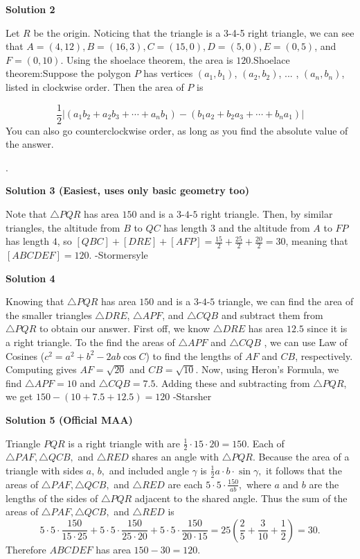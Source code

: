 \begin{enumerate}
\textbf{Solution 2}

Let $R$ be the origin. Noticing that the triangle is a 3-4-5 right triangle, we can see that $A=(4,12), B=(16,3), C=(15,0), D=(5,0), E=(0,5)$, and $F=(0,10)$. Using the shoelace theorem, the area is $\boxed{120}$.Shoelace theorem:Suppose the polygon $P$ has vertices $(a_1, b_1)$, $(a_2, b_2)$, ... , $(a_n, b_n)$, listed in clockwise order. Then the area of $P$ is

 
 \[\dfrac{1}{2} |(a_1b_2 + a_2b_3 + \cdots + a_nb_1) - (b_1a_2 + b_2a_3 + \cdots + b_na_1)|\]You can also go counterclockwise order, as long as you find the absolute value of the answer.

 .

 



\textbf{Solution 3 (Easiest, uses only basic geometry too)}

Note that $\triangle{PQR}$ has area $150$ and is a $3$-$4$-$5$ right triangle. Then, by similar triangles, the altitude from $B$ to $QC$ has length $3$ and the altitude from $A$ to $FP$ has length $4$, so $[QBC]+[DRE]+[AFP]=\frac{15}{2}+\frac{25}{2}+\frac{20}{2}=30$, meaning that $[ABCDEF]=\boxed{120}$. -Stormersyle

 



\textbf{Solution 4}

Knowing that $\triangle{PQR}$ has area $150$ and is a $3$-$4$-$5$ triangle, we can find the area of the smaller triangles $\triangle{DRE}$, $\triangle{APF}$, and $\triangle{CQB}$ and subtract them from $\triangle{PQR}$ to obtain our answer. First off, we know $\triangle{DRE}$ has area $12.5$ since it is a right triangle. To the find the areas of $\triangle{APF}$ and $\triangle{CQB}$ , we can use Law of Cosines ($c^2 = a^2 + b^2 - 2ab\cos C$) to find the lengths of $AF$ and $CB$, respectively. Computing gives $AF = \sqrt{20}$ and $CB = \sqrt{10}$. Now, using Heron's Formula, we find $\triangle{APF} = 10$ and $\triangle{CQB} = 7.5$. Adding these and subtracting from $\triangle{PQR}$, we get $150 - (10 + 7.5 + 12.5) = \boxed{120}$ -Starsher

 



\textbf{Solution 5 (Official MAA)}

Triangle $PQR$ is a right triangle with are $\frac12\cdot15\cdot20=150$. Each of $\triangle PAF,\triangle QCB,$ and $\triangle RED$ shares an angle with $\triangle PQR$. Because the area of a triangle with sides $a,\,b,$ and included angle $\gamma$ is $\frac12a\cdot b\cdot \sin\gamma,$ it follows that the areas of $\triangle PAF,\triangle QCB,$ and $\triangle RED$ are each $5\cdot5\cdot\frac{150}{ab},$ where $a$ and $b$ are the lengths of the sides of $\triangle PQR$ adjacent to the shared angle. Thus the sum of the areas of $\triangle PAF,\triangle QCB,$ and $\triangle RED$ is 
 \[5\cdot5\cdot\frac{150}{15\cdot25}+5\cdot5\cdot\frac{150}{25\cdot20}+5\cdot5\cdot\frac{150}{20\cdot15}=25\left(\frac25+\frac3{10}+\frac12\right)=30.\] Therefore $ABCDEF$ has area $150-30=\boxed{120}$.


\end{enumerate}
